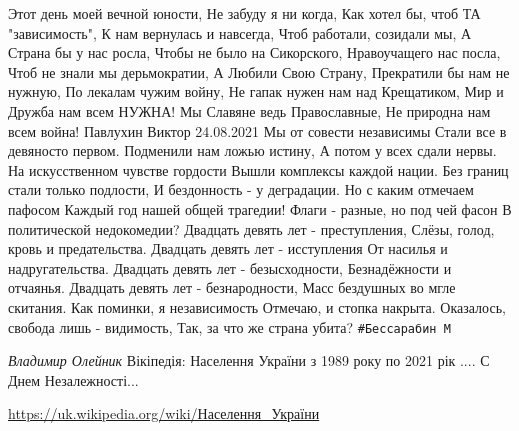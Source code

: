\begin{itemize}
\obeycr
Этот день моей вечной юности,
Не забуду я ни когда,
Как хотел бы, чтоб ТА "зависимость",
К нам вернулась и навсегда,
Чтоб работали, созидали мы,
А Страна бы у нас росла,
Чтобы не было на Сикорского,
Нравоучащего нас посла,
Чтоб не знали мы дерьмократии,
А Любили Свою Страну,
Прекратили бы нам не нужную,
По лекалам чужим войну,
Не гапак нужен нам над Крещатиком,
Мир и Дружба нам всем НУЖНА!
Мы Славяне ведь Православные,
Не природна нам всем война!
\smallskip
Павлухин Виктор 24.08.2021
\smallskip
Мы от совести независимы
Стали все в девяносто первом.
Подменили нам ложью истину,
А потом у всех сдали нервы.
На искусственном чувстве гордости
Вышли комплексы каждой нации.
Без границ стали только подлости,
И бездонность - у деградации.
Но с каким отмечаем пафосом
Каждый год нашей общей трагедии!
Флаги - разные, но под чей фасон
В политической недокомедии?
Двадцать девять лет - преступления,
Слёзы, голод, кровь и предательства.
Двадцать девять лет - исступления
От насилья и надругательства.
Двадцать девять лет - безысходности,
Безнадёжности и отчаянья.
Двадцать девять лет - безнародности,
Масс бездушных во мгле скитания.
Как поминки, я независимость
Отмечаю, и стопка накрыта.
Оказалось, свобода лишь - видимость,
Так, за что же страна убита?
\verb|#Бессарабин М|
\restorecr

\emph{Владимир Олейник}
Вікіпедія: Населення України з 1989 року по 2021 рік ....
С Днем Незалежності...

\url{https://uk.wikipedia.org/wiki/Населення_України}

\end{itemize}

